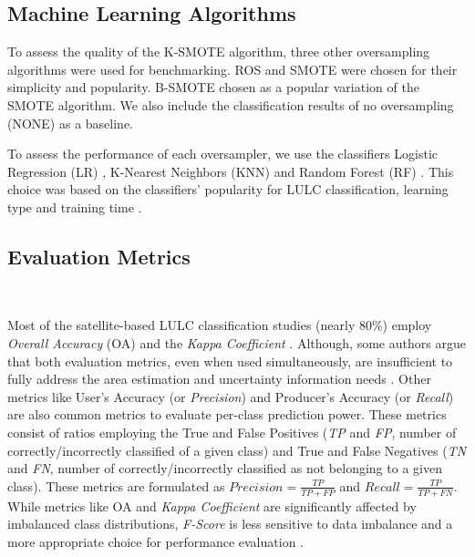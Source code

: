 \documentclass[remotesensing,article,submit,moreauthors,pdftex]{Definitions/mdpi}
\begin{document}
\begin{paracol}{2}
\linenumbers
\switchcolumn

\subsection{Machine Learning Algorithms}

To assess the quality of the K-SMOTE algorithm, three other oversampling
algorithms were used for benchmarking. ROS and SMOTE were chosen for their
simplicity and popularity. B-SMOTE chosen as a popular
variation of the SMOTE algorithm. We also include the classification
results of no oversampling (NONE) as a baseline.

To assess the performance of each oversampler, we use the classifiers Logistic
Regression (LR) \cite{Nelder1972}, K-Nearest Neighbors (KNN)
\cite{Cover1967} and Random Forest (RF)
\cite{Liaw2002}. This choice was based on the classifiers' popularity for LULC
classification, learning type and training time \cite{Maxwell2018,Gavade2019}.

\subsection{Evaluation Metrics}~\label{sec:evaluation-metrics}

Most of the satellite-based LULC classification studies (nearly 80\%) employ
\textit{Overall Accuracy} (OA) and the \textit{Kappa Coefficient}
\cite{Gavade2019}. Although, some authors argue that both evaluation metrics,
even when used simultaneously, are insufficient to fully address the area
estimation and uncertainty information needs \cite{Olofsson2013,Pontius2011}.
Other metrics like User's Accuracy (or \textit{Precision}) and Producer's
Accuracy (or \textit{Recall}) are also common metrics to evaluate per-class
prediction power. These metrics consist of ratios employing the True and False
Positives (\textit{TP} and \textit{FP}, number of correctly/incorrectly
classified of a given class) and True and
False Negatives (\textit{TN} and \textit{FN}, number of correctly/incorrectly
classified as not belonging to a given
class). These metrics are formulated as $Precision = \frac{TP}{TP+FP}$ and
$Recall = \frac{TP}{TP+FN}$. While metrics like OA and \textit{Kappa
Coefficient} are significantly affected by imbalanced class distributions,
\textit{F-Score} is less sensitive to data imbalance and a more appropriate
choice for performance evaluation \cite{Jeni2013}.


\end{paracol}
\end{document}
